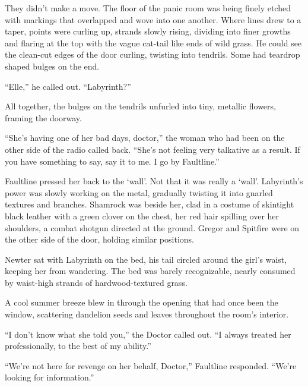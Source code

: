 They didn't make a move. The floor of the panic room was being finely etched with markings that overlapped and wove into one another.  Where lines drew to a taper, points were curling up, strands slowly rising, dividing into finer growths and flaring at the top with the vague cat-tail like ends of wild grass.  He could see the clean-cut edges of the door curling, twisting into tendrils.  Some had teardrop shaped bulges on the end.



``Elle,'' he called out.  ``Labyrinth?''



All together, the bulges on the tendrils unfurled into tiny, metallic flowers, framing the doorway.



``She's having one of her bad days, doctor,'' the woman who had been on the other side of the radio called back.  ``She's not feeling very talkative as a result.  If you have something to say, say it to me.  I go by Faultline.''



\blacksquare



Faultline pressed her back to the `wall'.  Not that it was really a `wall'.  Labyrinth's power was slowly working on the metal, gradually twisting it into gnarled textures and branches. Shamrock was beside her, clad in a costume of skintight black leather with a green clover on the chest, her red hair spilling over her shoulders, a combat shotgun directed at the ground.  Gregor and Spitfire were on the other side of the door, holding similar positions.



Newter sat with Labyrinth on the bed, his tail circled around the girl's waist, keeping her from wandering.  The bed was barely recognizable, nearly consumed by waist-high strands of hardwood-textured grass.



A cool summer breeze blew in through the opening that had once been the window, scattering dandelion seeds and leaves throughout the room's interior.



``I don't know what she told you,'' the Doctor called out.  ``I always treated her professionally, to the best of my ability.''



``We're not here for revenge on her behalf, Doctor,'' Faultline responded.  ``We're looking for information.''



